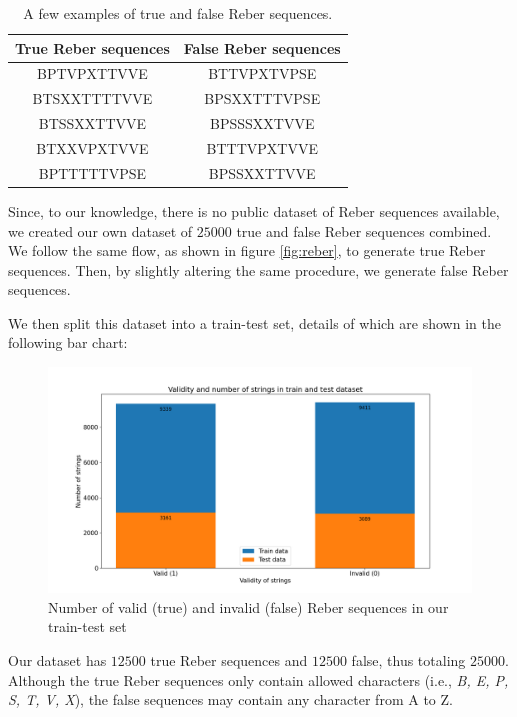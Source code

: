 \begin{table}[h]
	\centering
	\begin{tabular}{|c|c|}
	    \hline
		\textbf{True Reber sequences} & \textbf{False Reber sequences} \\
		\hline
		BPTVPXTTVVE & BTTVPXTVPSE \\
		BTSXXTTTTVVE & BPSXXTTTVPSE \\
		BTSSXXTTVVE & BPSSSXXTVVE \\
		BTXXVPXTVVE & BTTTVPXTVVE \\
		BPTTTTTVPSE & BPSSXXTTVVE \\
		\hline
	\end{tabular}
	\caption[A few examples of true and false Reber sequences]{A few examples of true and false Reber sequences.}
	\label{tab:reber}
\end{table}

Since, to our knowledge, there is no public dataset of Reber sequences available, we created our own dataset of $25000$ true and false Reber sequences combined. We follow the same flow, as shown in figure \ref{fig:reber}, to generate true Reber sequences. Then, by slightly altering the same procedure, we generate false Reber sequences.

We then split this dataset into a train-test set, details of which are shown in the following bar chart:

\begin{figure}[h]
    \centering
    \includegraphics[width=1.0\linewidth]{images/dataset/string_counts.png}
    \caption[Validity and number of strings in train-test dataset]{Number of valid (true) and invalid (false) Reber sequences in our train-test set}
    \label{fig:string_count}
\end{figure}

Our dataset has $12500$ true Reber sequences and $12500$ false, thus totaling $25000$. Although the true Reber sequences only contain allowed characters (i.e., \textit{B, E, P, S, T, V, X}), the false sequences may contain any character from A to Z.

